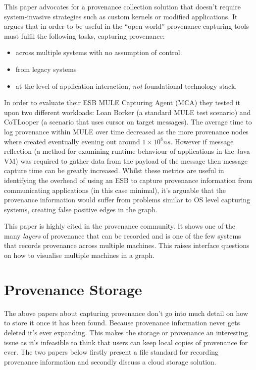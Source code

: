 This paper advocates for a provenance collection solution that doesn't require system-invasive strategies such as custom kernels or modified applications. It argues that in order to be useful in the ``open world'' provenance capturing tools must fulfil the following tasks, capturing provenance:
\begin{itemize}
  \item across multiple systems with no assumption of control.
  \item from legacy systems
  \item at the level of application interaction, \textit{not} foundational technology stack.
\end{itemize}

In order to evaluate their ESB MULE Capturing Agent (MCA) they tested it upon two different workloads: Loan Borker (a standard MULE test scenario) and CoTLooper (a scenario that uses cursor on target messages). The average time to log provenance within MULE over time decreased as the more provenance nodes where created eventually evening out around $1 \times 10^8ns$. However if message reflection (a method for examining runtime behaviour of applications in the Java VM) was required to gather data from the payload of the message then message capture time can be greatly increased. Whilst these metrics are useful in identifying the overhead of using an ESB to capture provenance information from communicating applications (in this case minimal), it's arguable that the provenance information would suffer from problems similar to OS level capturing systems, creating false positive edges in the graph.

This paper is highly cited in the provenance community. It shows one of the many \textit{layers} of provenance that can be recorded and is one of the few systems that records provenance across multiple machines. This raises interface questions on how to visualise multiple machines in a graph. 

\section{Provenance Storage}
\label{sec:provenance_storage}

The above papers about capturing provenance don't go into much detail on how to store it once it has been found. Because provenance information never gets deleted it's ever expanding. This makes the storage or provenance an interesting issue as it's infeasible to think that users can keep local copies of provenance for ever. The two papers below firstly present a file standard for recording provenance information and secondly discuss a cloud storage solution.

